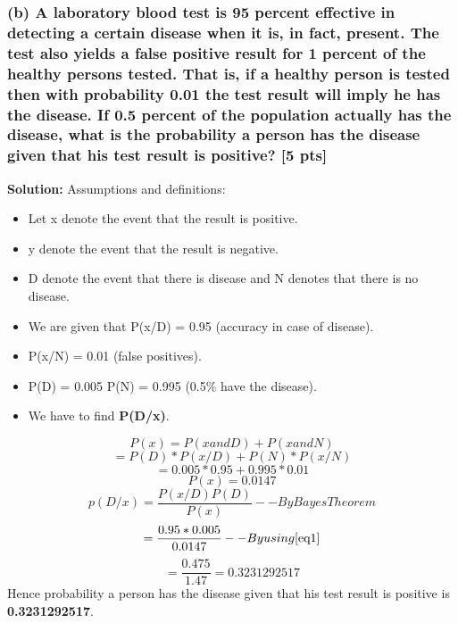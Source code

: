 \documentclass[twoside,10pt]{article}
\begin{document}
\vspace{1cm}


\subsubsection*{(b) A laboratory blood test is 95 percent effective in detecting a certain disease when it is, in fact, present. The test also yields a false positive result for 1 percent of the healthy persons tested. That is, if a healthy person is tested then with probability 0.01 the test result will imply he has the disease. If 0.5 percent of the population actually has the disease, what is the probability a person has the disease given that his test result is positive? [5 pts]}

\textbf{ Solution: }	
 Assumptions and definitions: \\
\begin{itemize}
    \item Let x denote the event that the result is positive. 
    \item y denote the event that the result is negative.
    \item D denote the event that there is disease and N denotes that there is no disease.
    \item We are given that P(x/D) = 0.95 (accuracy in case of disease).
    \item P(x/N) = 0.01 (false positives).
    \item P(D) = 0.005 P(N) = 0.995 (0.5\% have the disease).
    \item We have to find \textbf{P(D/x)}.
\end{itemize}
\begin{equation*}
P(x) = P(x and D) + P(x and N)
\end{equation*}
\begin{equation*}
= P(D)*P(x/D) + P(N)* P(x/N)
\end{equation*}
\begin{equation*}
=0.005*0.95 + 0.995*0.01 
\end{equation*}
\begin{equation*}\label{eq1}
P(x) = 0.0147
\end{equation*}
\begin{equation*}
p(D/x) = \frac{P(x/D)P(D)}{P(x)} -- By Bayes Theorem
\end{equation*}
\begin{equation*}
= \frac{0.95*0.005}{0.0147} -- By using \ref{eq1}
\end{equation*}
\begin{equation*}
= \frac{0.475}{1.47} = 0.3231292517
\end{equation*}
Hence probability a person has the disease given that his test result is positive is \textbf{0.3231292517}.
\end{document}
